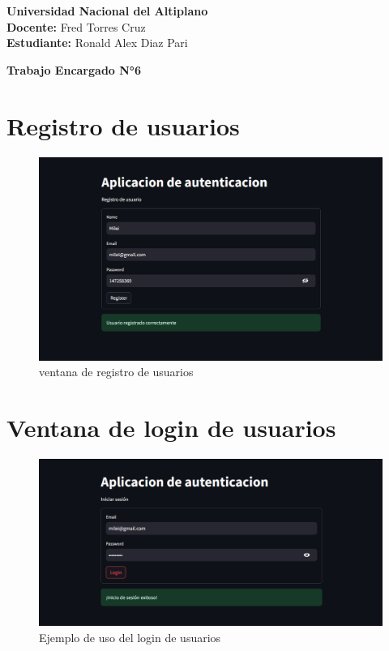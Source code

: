 \documentclass[12pt]{article}
\begin{document}
\noindent \textbf{Universidad Nacional del Altiplano\\
Docente: } Fred Torres Cruz\\
\textbf{Estudiante:} Ronald Alex Diaz Pari

\vspace{2mm}
\noindent\textbf{Trabajo Encargado N°6}\\
\section{Registro de usuarios}

\begin{figure}[H]
    \centering
    \includegraphics[width=1\textwidth]{./img/Register.png}
    \caption{ventana de registro de usuarios}
    \label{fig:my_label}
\end{figure}


\section{Ventana de login de usuarios}
\begin{figure}[H]
    \centering
    \includegraphics[width=1\textwidth]{./img/Login.png}
    \caption{Ejemplo de uso del login de usuarios}
    \label{fig:my_label}
\end{figure}
\end{document}
